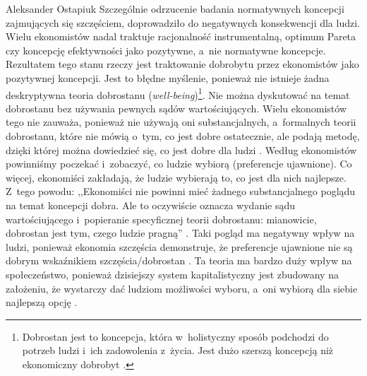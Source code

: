 \begin{artplenv}{Aleksander Ostapiuk}
Szczególnie odrzucenie badania normatywnych koncepcji zajmujących się szczęściem, doprowadziło do negatywnych
konsekwencji dla ludzi. Wielu ekonomistów nadal traktuje racjonalność instrumentalną, optimum Pareta czy koncepcję
efektywności jako pozytywne, a~nie normatywne koncepcje. Rezultatem tego stanu rzeczy jest traktowanie dobrobytu przez
ekonomistów jako pozytywnej koncepcji. Jest to błędne myślenie, ponieważ nie istnieje żadna deskryptywna teoria
dobrostanu (\textit{well-being})\footnote{Dobrostan jest to koncepcja, która w~holistyczny sposób podchodzi do potrzeb
ludzi i~ich zadowolenia z~życia. Jest dużo szerszą koncepcją niż ekonomiczny dobrobyt \parencite[por.][]{rybka_2019}.}.
Nie można dyskutować na temat
dobrostanu bez używania pewnych sądów wartościujących. Wielu ekonomistów tego nie zauważa, ponieważ nie używają oni
substancjalnych, a~formalnych teorii dobrostanu, które nie mówią o~tym, co jest dobre ostatecznie, ale podają metodę,
dzięki której można dowiedzieć się, co jest dobre dla ludzi
\parencite[s.~245]{hausman_etyka_2017_ost}.
Według ekonomistów powinniśmy poczekać i~zobaczyć, co ludzie wybiorą (preferencje ujawnione). Co więcej, ekonomiści
zakładają, że ludzie wybierają to, co jest dla nich najlepsze. Z~tego powodu: ,,Ekonomiści nie powinni mieć żadnego
substancjalnego poglądu na temat koncepcji dobra. Ale to oczywiście oznacza wydanie sądu wartościującego i~popieranie
specyficznej teorii dobrostanu: mianowicie, dobrostan jest tym, czego ludzie pragną''
\parencite[s.~214]{reiss_philosophy_2013}.
Taki pogląd ma negatywny wpływ na ludzi, ponieważ ekonomia szczęścia demonstruje, że preferencje
ujawnione nie są dobrym wskaźnikiem szczęścia/dobrostan
\parencites{bruni_economics_2005,bruni_handbook_2007}{bruni_capabilities_2008}%
{kahneman_well-being:_1999}{frey_what_2002}{frey_happiness_2010,frey_economics_2018}.
Ta teoria ma bardzo duży wpływ na
społeczeństwo, ponieważ dzisiejszy system kapitalistyczny jest zbudowany na założeniu, że wystarczy dać ludziom
możliwości wyboru, a~oni wybiorą dla siebie najlepszą opcję
\parencite[zob.][]{friedman_free_1980}.


\end{artplenv}
